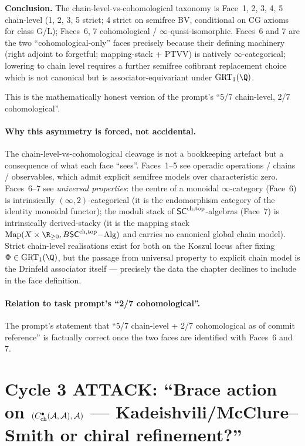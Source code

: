 \textbf{Conclusion.} The chain-level-vs-cohomological taxonomy is Face~1, 2, 3, 4, 5 chain-level (1, 2, 3, 5 strict; 4 strict on semifree BV, conditional on CG axioms for class G/L); Faces~6, 7 cohomological / $\infty$-quasi-isomorphic. Faces~6 and 7 are the two ``cohomological-only'' faces precisely because their defining machinery (right adjoint to forgetful; mapping-stack + PTVV) is natively $\infty$-categorical; lowering to chain level requires a further semifree cofibrant replacement choice which is not canonical but is associator-equivariant under $\mathrm{GRT}_1(\Q)$.

This is the mathematically honest version of the prompt's ``5/7 chain-level, 2/7 cohomological''.

\paragraph{Why this asymmetry is forced, not accidental.} The chain-level-vs-cohomological cleavage is not a bookkeeping artefact but a consequence of what each face ``sees''. Faces~1--5 see operadic operations / chains / observables, which admit explicit semifree models over characteristic zero. Faces~6--7 see \emph{universal properties}: the centre of a monoidal $\infty$-category (Face~6) is intrinsically $(\infty, 2)$-categorical (it is the endomorphism category of the identity monoidal functor); the moduli stack of $\mathsf{SC}^{\mathrm{ch},\mathrm{top}}$-algebras (Face~7) is intrinsically derived-stacky (it is the mapping stack $\mathrm{Map}(X \times \R_{\ge 0}, B\SCchtop\mathrm{-Alg})$ and carries no canonical global chain model). Strict chain-level realisations exist for both on the Koszul locus after fixing $\Phi \in \mathrm{GRT}_1(\Q)$, but the passage from universal property to explicit chain model is the Drinfeld associator itself --- precisely the data the chapter declines to include in the face definition.

\paragraph{Relation to task prompt's ``2/7 cohomological''.} The prompt's statement that ``5/7 chain-level + 2/7 cohomological as of commit reference'' is factually correct once the two faces are identified with Faces~6 and 7.

\section{Cycle 3 ATTACK: ``Brace action on \texorpdfstring{$(C^\bullet_{\mathrm{ch}}(\mathcal{A}, \mathcal{A}), \mathcal{A})$}{(Ch\textasciicircum bullet ch(A,A), A)} --- Kadeishvili/McClure--Smith or chiral refinement?''}

